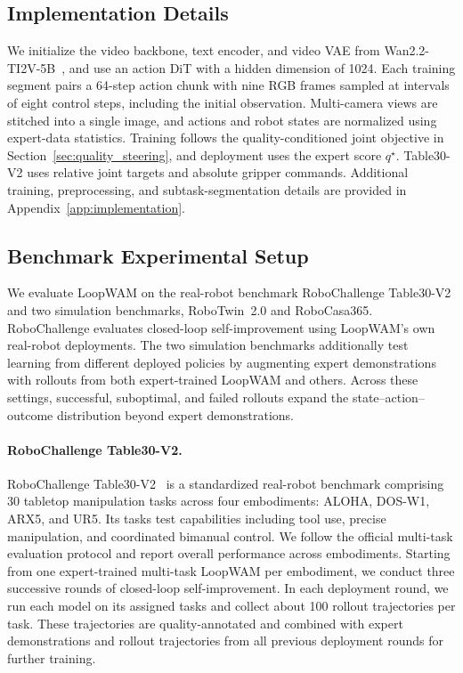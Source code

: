 
\subsection{Implementation Details}
\label{sec:implementation}

We initialize the video backbone, text encoder, and video VAE from Wan2.2-TI2V-5B~\citep{wan2025}, and use an action DiT with a hidden dimension of 1024.
Each training segment pairs a 64-step action chunk with nine RGB frames sampled at intervals of eight control steps, including the initial observation.
Multi-camera views are stitched into a single image, and actions and robot states are normalized using expert-data statistics.
Training follows the quality-conditioned joint objective in Section~\ref{sec:quality_steering}, and deployment uses the expert score $q^\star$.
Table30-V2 uses relative joint targets and absolute gripper commands.
Additional training, preprocessing, and subtask-segmentation details are provided in Appendix~\ref{app:implementation}.

\subsection{Benchmark Experimental Setup}
\label{sec:benchmark_setup}

We evaluate LoopWAM on the real-robot benchmark RoboChallenge Table30-V2 and two simulation benchmarks, RoboTwin~2.0 and RoboCasa365.
RoboChallenge evaluates closed-loop self-improvement using LoopWAM's own real-robot deployments.
The two simulation benchmarks additionally test learning from different deployed policies by augmenting expert demonstrations with rollouts from both expert-trained LoopWAM and others.
Across these settings, successful, suboptimal, and failed rollouts expand the state--action--outcome distribution beyond expert demonstrations.

\paragraph{RoboChallenge Table30-V2.}
RoboChallenge Table30-V2~\citep{robochallenge2026table30v2} is a standardized real-robot benchmark comprising 30 tabletop manipulation tasks across four embodiments: ALOHA, DOS-W1, ARX5, and UR5.
Its tasks test capabilities including tool use, precise manipulation, and coordinated bimanual control.
We follow the official multi-task evaluation protocol and report overall performance across embodiments.
Starting from one expert-trained multi-task LoopWAM per embodiment, we conduct three successive rounds of closed-loop self-improvement.
In each deployment round, we run each model on its assigned tasks and collect about 100 rollout trajectories per task.
These trajectories are quality-annotated and combined with expert demonstrations and rollout trajectories from all previous deployment rounds for further training.

